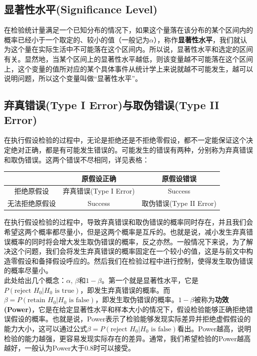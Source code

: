 \documentclass[UTF8]{ctexbook}
\begin{document}
\subsection{显著性水平(Significance Level)}
在检验统计量满足一个已知分布的情况下，如果这个量落在该分布的某个区间内的概率已经小于一个取定的、较小的值（一般记为$\alpha$），称作\textbf{显著性水平}，我们就认为这个量在实际生活中不可能落在这个区间内。所以说，显著性水平和选定的区间有关。显然地，当某个区间上的显著性水平越低，则该变量越不可能落在这个区间上，这个变量的值所对应的某个具体事件从统计学上来说就越不可能发生，越可以说明问题，所以这个变量叫做“显著性水平”。
\subsection{弃真错误(Type I Error)与取伪错误(Type II Error)}
在执行假设检验的过程中，无论是拒绝还是不拒绝零假设，都不一定能保证这个决定绝对正确，都是有可能发生错误的。可能发生的错误有两种，分别称为弃真错误和取伪错误。这两个错误不尽相同，详见表格：
\begin{center}
    \begin{tabular}{|c|c|c|}
    \hline\hline
         &原假设正确&原假设错误  \\ \hline
         拒绝原假设&弃真错误(Type I Error)&Success\\ \hline
         无法拒绝原假设&Success&取伪错误(Type II Error)\\ \hline
    \hline
    \end{tabular}
\end{center}

在执行假设检验的过程中，导致弃真错误和取伪错误的概率同时存在，并且我们会希望这两个概率都尽量小，但是这两个概率是互斥的。也就是说，减小发生弃真错误概率的同时将会增大发生取伪错误的概率，反之亦然。一般情况下来说，为了解决这个问题，我们会将发生弃真错误的概率固定在一个较小的值，这是与前文中构造零假设和备择假设呼应的。然后我们在检验过程中进行控制，使得发生取伪错误的概率尽量小。\\
\indent 此处给出几个概念：$\alpha$, $\beta$和$1-\beta$。第一个就是显著性水平，它是$P(\text{reject }H_0|H_0\text{ is true})$，即发生弃真错误的概率。而$\beta=P(\text{retain }H_0|H_0\text{ is false})$，即发生取伪错误的概率。$1-\beta$被称为\textbf{功效(Power)}，它是在给定显著性水平和样本大小的情况下，假设检验能够正确拒绝错误假设的概率。也就是说，Power表示了检验能够发现实际差异并拒绝虚假假设的能力大小，这可以通过公式$\beta=P(\text{reject }H_0|H_0\text{ is false})$看出。Power越高，说明检验的能力越强，更容易发现实际存在的差异。通常，我们希望检验的Power越高越好，一般认为Power大于0.8时可以接受。
\end{document}
